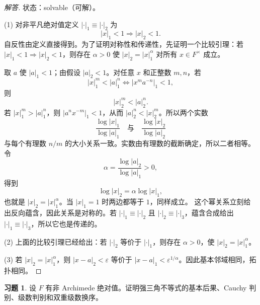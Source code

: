 \documentclass[11pt,a4paper,openany]{ctexbook}
\numberwithin{equation}{chapter}
\theoremstyle{plain}
\theoremstyle{definition}
\newtheorem{exercise}[theorem]{习题}
\theoremstyle{remark}
\begin{document}
\begin{proof}[解答]
状态：solvable（可解）。

(1) 对非平凡绝对值定义 $|\cdot|_1\equiv|\cdot|_2$ 为
\[
|x|_1<1\Longrightarrow |x|_2<1.
\]
自反性由定义直接得到。为了证明对称性和传递性，先证明一个比较引理：若
$|x|_1<1\Rightarrow |x|_2<1$，则存在 $\alpha>0$ 使
$|x|_2=|x|_1^\alpha$ 对所有 $x\in F^\times$ 成立。

取 $a$ 使 $|a|_1<1$；由假设 $|a|_2<1$。对任意 $x$ 和正整数 $m,n$，若
\[
|x|_1^m<|a|_1^n
\Longleftrightarrow
|x^m a^{-n}|_1<1,
\]
则
\[
|x|_2^m<|a|_2^n.
\]
若 $|x|_1^m>|a|_1^n$，则 $|a^n x^{-m}|_1<1$，从而
$|a|_2^n<|x|_2^m$。所以两个实数
\[
\frac{\log |x|_1}{\log |a|_1}
\quad\text{与}\quad
\frac{\log |x|_2}{\log |a|_2}
\]
与每个有理数 $n/m$ 的大小关系一致。实数由有理数的截断确定，所以二者相等。令
\[
\alpha=\frac{\log |a|_2}{\log |a|_1}>0,
\]
得到
\[
\log |x|_2=\alpha\log |x|_1,
\]
也就是 $|x|_2=|x|_1^\alpha$。当 $|x|_1=1$ 时两边都等于 $1$，同样成立。
这个幂关系立刻给出反向蕴含，因此关系是对称的。若
$|\cdot|_1\equiv|\cdot|_2$ 且 $|\cdot|_2\equiv|\cdot|_3$，蕴含合成给出
$|\cdot|_1\equiv|\cdot|_3$，所以它也是传递的。

(2) 上面的比较引理已经给出：若 $|\cdot|_2$ 等价于 $|\cdot|_1$，则存在
$\alpha>0$，使 $|x|_2=|x|_1^\alpha$。

(3) 若 $|x|_2=|x|_1^\alpha$，则 $|x-a|_2<\varepsilon$ 等价于 $|x-a|_1<\varepsilon^{1/\alpha}$。因此基本邻域相同，拓扑相同。
\end{proof}

\begin{exercise}
设 $F$ 有非 Archimede 绝对值。证明强三角不等式的基本后果、Cauchy 判别、级数判别和双重级数换序。
\end{exercise}
\end{document}
